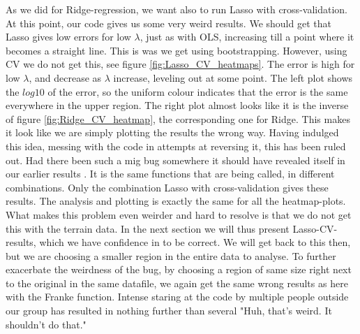 \documentclass[reprint,english,notitlepage,aps,nobalancelastpage,nofootinbib]{revtex4-1}  %
\begin{document}
As we did for Ridge-regression, we want also to run Lasso with cross-validation. At this point, our code gives us some very weird results. We should get that Lasso gives low errors for low $\lambda$, just as with OLS, increasing till a point where it becomes a straight line. This is was we get using bootstrapping. However, using CV we do not get this, see figure \ref{fig:Lasso_CV_heatmaps}. The error is high for low $\lambda$, and decrease as $\lambda$ increase, leveling out at some point. The left plot shows the $log10$ of the error, so the uniform colour indicates that the error is the same everywhere in the upper region. The right plot almost looks like it is the inverse of figure \ref{fig:Ridge_CV_heatmap}, the corresponding one for Ridge. This makes it look like we are simply plotting the results the wrong way. Having indulged this idea, messing with the code in attempts at reversing it, this has been ruled out. Had there been such a mig bug somewhere it should have revealed itself in our earlier results . It is the same functions that are being called, in different combinations. Only the combination Lasso with cross-validation gives these results. The analysis and plotting is exactly the same for all the heatmap-plots. What makes this problem even weirder and hard to resolve is that we do not get this with the terrain data. In the next section we will thus present Lasso-CV-results, which we have confidence in to be correct. We will get back to this then, but we are choosing a smaller region in the entire data to analyse. To further exacerbate the weirdness of the bug, by choosing a region of same size right next to the original in the same datafile, we again get the same wrong results as here with the Franke function. Intense staring at the code by multiple people outside our group has resulted in nothing further than several "Huh, that's weird. It shouldn't do that."
\end{document}
